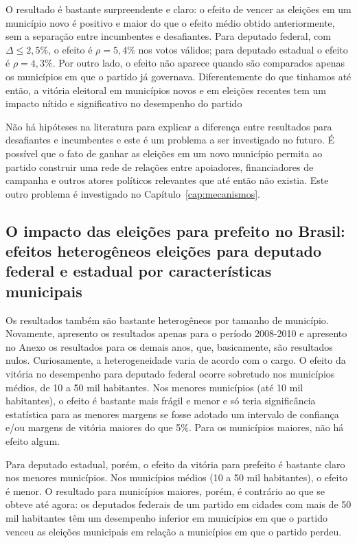 O resultado é bastante surpreendente e claro: o efeito de vencer as eleições em um município novo é positivo e maior do que o efeito médio obtido anteriormente, sem a separação entre incumbentes e desafiantes. Para deputado federal, com $\Delta \leq 2,5\%$, o efeito é $\rho=5,4\%$ nos votos válidos; para deputado estadual o efeito é $\rho=4,3\%$. Por outro lado, o efeito não aparece quando são comparados apenas os municípios em que o partido já governava. Diferentemente do que tinhamos até então, a vitória eleitoral em municípios novos e em eleições recentes tem um impacto nítido e significativo no desempenho do partido 

Não há hipóteses na literatura para explicar a diferença entre resultados para desafiantes e incumbentes e este é um problema a ser investigado no futuro. É possível que o fato de ganhar as eleições em um novo município permita ao partido construir uma rede de relações entre apoiadores, financiadores de campanha e outros atores políticos relevantes que até então não existia. Este outro problema é investigado no Capítulo~\ref{cap:mecanismos}.

\subsection{O impacto das eleições para prefeito no Brasil: efeitos heterogêneos eleições para deputado federal e estadual por características municipais}

Os resultados também são bastante heterogêneos por tamanho de município. Novamente, apresento os resultados apenas para o período 2008-2010 e apresento no Anexo os resultados para os demais anos, que, basicamente, são resultados nulos. Curiosamente, a heterogeneidade varia de acordo com o cargo. O efeito da vitória no desempenho para deputado federal ocorre sobretudo nos municípios médios, de 10 a 50 mil habitantes. Nos menores municípios (até 10 mil habitantes), o efeito é bastante mais frágil e menor e só teria significância estatística para as menores margens se fosse adotado um intervalo de confiança e/ou margens de vitória maiores do que 5\%. Para os municípios maiores, não há efeito algum.

Para deputado estadual, porém, o efeito da vitória para prefeito é bastante claro nos menores municípios. Nos municípios médios (10 a 50 mil habitantes), o efeito é menor. O resultado para municípios maiores, porém, é contrário ao que se obteve até agora: os deputados federais de um partido em cidades com mais de 50 mil habitantes têm um desempenho inferior em municípios em que o partido venceu as eleições municipais em relação a municípios em que o partido perdeu.

